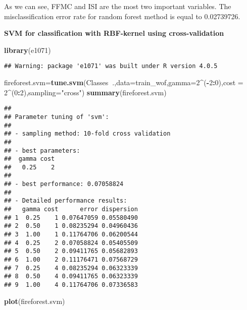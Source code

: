 \documentclass[
]{article}
\newenvironment{Shaded}{\begin{snugshade}}{\end{snugshade}}
\newcommand{\DataTypeTok}[1]{\textcolor[rgb]{0.13,0.29,0.53}{#1}}
\newcommand{\DecValTok}[1]{\textcolor[rgb]{0.00,0.00,0.81}{#1}}
\newcommand{\KeywordTok}[1]{\textcolor[rgb]{0.13,0.29,0.53}{\textbf{#1}}}
\newcommand{\NormalTok}[1]{#1}
\newcommand{\OperatorTok}[1]{\textcolor[rgb]{0.81,0.36,0.00}{\textbf{#1}}}
\newcommand{\StringTok}[1]{\textcolor[rgb]{0.31,0.60,0.02}{#1}}
\begin{document}
As we can see, FFMC and ISI are the most two important variables. The
misclassification error rate for random forest method is equal to
0.02739726.

\textbf{SVM for classification with RBF-kernel using cross-validation}

\begin{Shaded}
\begin{Highlighting}[]
\KeywordTok{library}\NormalTok{(e1071)}
\end{Highlighting}
\end{Shaded}

\begin{verbatim}
## Warning: package 'e1071' was built under R version 4.0.5
\end{verbatim}

\begin{Shaded}
\begin{Highlighting}[]
\NormalTok{fireforest.svm=}\KeywordTok{tune.svm}\NormalTok{(Classes}\OperatorTok{~}\NormalTok{.,}\DataTypeTok{data=}\NormalTok{train_wof,}\DataTypeTok{gamma=}\DecValTok{2}\OperatorTok{^}\NormalTok{(}\OperatorTok{-}\DecValTok{2}\OperatorTok{:}\DecValTok{0}\NormalTok{),}\DataTypeTok{cost =} \DecValTok{2}\OperatorTok{^}\NormalTok{(}\DecValTok{0}\OperatorTok{:}\DecValTok{2}\NormalTok{),}\DataTypeTok{sampling=}\StringTok{"cross"}\NormalTok{)}
\KeywordTok{summary}\NormalTok{(fireforest.svm)}
\end{Highlighting}
\end{Shaded}

\begin{verbatim}
## 
## Parameter tuning of 'svm':
## 
## - sampling method: 10-fold cross validation 
## 
## - best parameters:
##  gamma cost
##   0.25    2
## 
## - best performance: 0.07058824 
## 
## - Detailed performance results:
##   gamma cost      error dispersion
## 1  0.25    1 0.07647059 0.05580490
## 2  0.50    1 0.08235294 0.04960436
## 3  1.00    1 0.11764706 0.06200544
## 4  0.25    2 0.07058824 0.05405509
## 5  0.50    2 0.09411765 0.05682893
## 6  1.00    2 0.11176471 0.07568729
## 7  0.25    4 0.08235294 0.06323339
## 8  0.50    4 0.09411765 0.06323339
## 9  1.00    4 0.11764706 0.07336583
\end{verbatim}

\begin{Shaded}
\begin{Highlighting}[]
\KeywordTok{plot}\NormalTok{(fireforest.svm)}
\end{Highlighting}
\end{Shaded}
\end{document}
